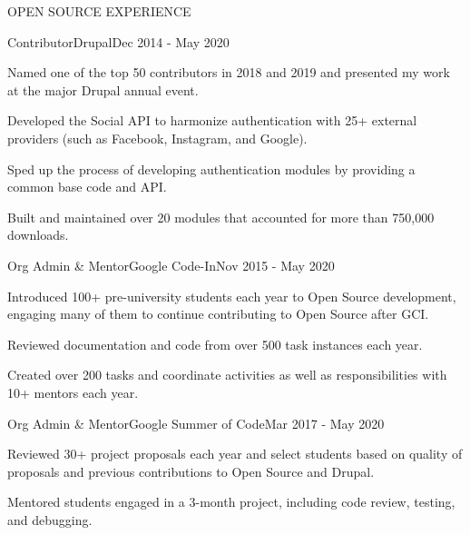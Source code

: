 \documentclass{resume} %
\begin{document}

\begin{rSection}{OPEN SOURCE EXPERIENCE}

\begin{rSubsection}{Contributor}{Drupal}{}{Dec 2014 - May 2020}
\item Named one of the top 50 contributors in 2018 and 2019 and presented my work at the major Drupal annual event.
\item Developed the Social API to harmonize authentication with 25+ external providers (such as Facebook, Instagram, and Google).
\item Sped up the process of developing authentication modules by providing a common base code and API.
\item Built and maintained over 20 modules that accounted for more than 750,000 downloads.
\end{rSubsection}


\begin{rSubsection}{Org Admin \& Mentor}{Google Code-In}{}{Nov 2015 - May 2020}
\item Introduced 100+ pre-university students each year to Open Source development, engaging many of them to continue contributing to Open Source after GCI.
\item Reviewed documentation and code from over 500 task instances each year.
\item Created over 200 tasks and coordinate activities as well as responsibilities with 10+ mentors each year.
\end{rSubsection}


\begin{rSubsection}{Org Admin \& Mentor}{Google Summer of Code}{}{Mar 2017 - May 2020}
\item Reviewed 30+ project proposals each year and select students based on quality of proposals and previous contributions to Open Source and Drupal.
\item Mentored students engaged in a 3-month project, including code review, testing, and debugging.
\end{rSubsection}

\end{rSection}





\end{document}
